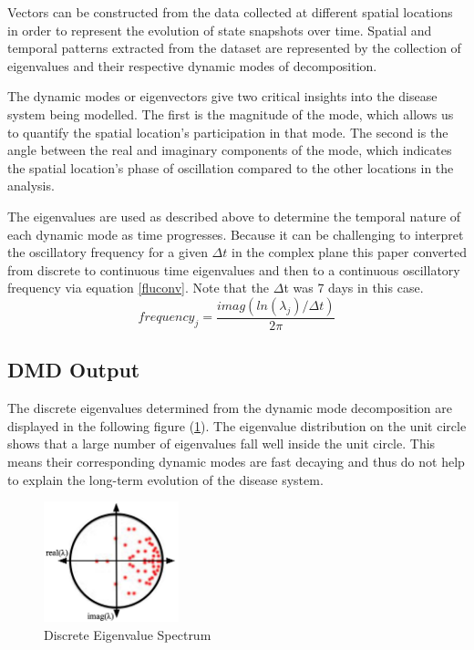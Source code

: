 \documentclass[12pt]{report}
\begin{document}
Vectors can be constructed from the data collected at different spatial locations in order to represent the evolution of state snapshots over time. Spatial and temporal patterns extracted from the dataset are represented by the collection of eigenvalues and their respective dynamic modes of decomposition. 

The dynamic modes or eigenvectors give two critical insights into the disease system being modelled. The first is the magnitude of the mode, which allows us to quantify the spatial location’s participation in that mode. The second is the angle between the real and imaginary components of the mode, which indicates the spatial location's phase of oscillation compared to the other locations in the analysis. 

The eigenvalues are used as described above to determine the temporal nature of each dynamic mode as time progresses. Because it can be challenging to interpret the oscillatory frequency for a given $\Delta{t}$ in the complex plane this paper converted from discrete to continuous time eigenvalues and then to a continuous oscillatory frequency via equation \eqref{fluconv}. Note that the $\Delta$t was 7 days in this case.
\begin{equation}\label{fluconv}
    frequency_{j}=\frac{imag(ln(\lambda_{j})/\Delta{t})}{2\pi}
\end{equation}

\subsection{DMD Output}

The discrete eigenvalues determined from the dynamic mode decomposition are displayed in the following figure (\ref{fig:GFTDEv}). The eigenvalue distribution on the unit circle shows that a large number of eigenvalues fall well inside the unit circle. This means their corresponding dynamic modes are fast decaying and thus do not help to explain the long-term evolution of the disease system.   

\begin{figure}[H]
    \centering
    \includegraphics[width=0.35\textwidth]{Application pics/MA680 Ep. eigen.png}
    \caption{Discrete Eigenvalue Spectrum} \label{fig:GFTDEv}
\end{figure}
\noindent
\end{document}
